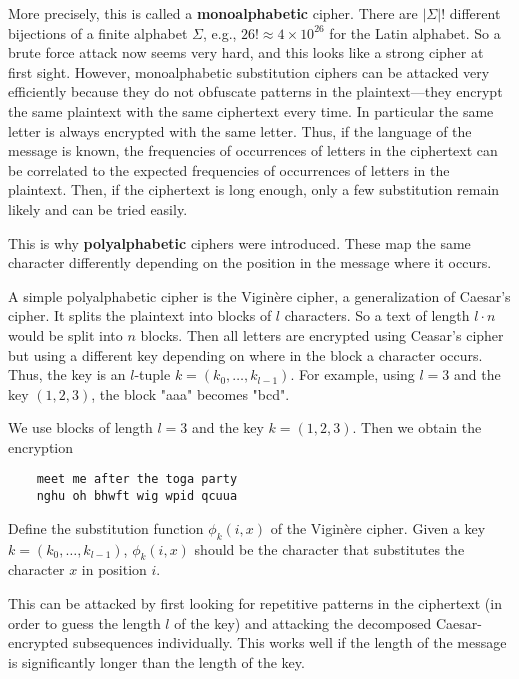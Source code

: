 More precisely, this is called a \textbf{monoalphabetic} cipher.
There are $|\Sigma|!$ different bijections of a finite alphabet $\Sigma$, e.g., $26!\approx 4\times 10^{26}$ for the Latin alphabet.
So a brute force attack now seems very hard, and this looks like a strong cipher at first sight. 
However, monoalphabetic substitution ciphers can be attacked very efficiently because they do not obfuscate patterns in the plaintext---they encrypt the same plaintext with the same ciphertext every time.
In particular the same letter is always encrypted with the same letter. 
Thus, if the language of the message is known, the frequencies of occurrences of letters in the ciphertext can be correlated to the expected frequencies of occurrences of letters in the plaintext.
Then, if the ciphertext is long enough, only a few substitution remain likely and can be tried easily.

This is why \textbf{polyalphabetic} ciphers were introduced.
These map the same character differently depending on the position in the message where it occurs.

A simple polyalphabetic cipher is the Vigin\`ere cipher, a generalization of Caesar's cipher.
It splits the plaintext into blocks of $l$ characters.
So a text of length $l\cdot n$ would be split into $n$ blocks.
Then all letters are encrypted using Ceasar's cipher but using a different key depending on where in the block a character occurs.
Thus, the key is an $l$-tuple $k=(k_0,\ldots,k_{l-1})$.
For example, using $l=3$ and the key $(1,2,3)$, the block "aaa" becomes "bcd". 

\begin{example}
 We use blocks of length $l=3$ and the key $k=(1,2,3)$.
 Then we obtain the encryption
  \begin{lstlisting}
    meet me after the toga party
    nghu oh bhwft wig wpid qcuua
  \end{lstlisting}
\end{example}

\begin{exercise}\label{exc:sd:viginere}
Define the substitution function $\phi_k(i,x)$ of the Vigin\`ere cipher.
Given a key $k=(k_0,\ldots,k_{l-1})$, $\phi_k(i,x)$ should be the character that substitutes the character $x$ in position $i$.
\end{exercise}

This can be attacked by first looking for repetitive patterns in the ciphertext (in order to guess the length $l$ of the key) and attacking the decomposed Caesar-encrypted subsequences individually.
This works well if the length of the message is significantly longer than the length of the key. 

